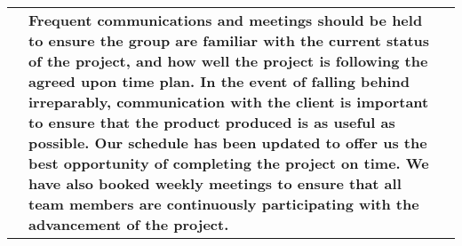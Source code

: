 \begin{xltabular}[H]{1.4\textwidth}{p{0.1\textwidth} | p{0.4\textwidth} | p{0.9\textwidth}}
    &

   \textbf{Frequent communications and meetings should be held to ensure the group are familiar with the current status of the project, and how well the project is following the agreed upon time plan. In the event of falling behind irreparably, communication with the client is important to ensure that the product produced is as useful as possible. Our schedule has been updated to offer us the best opportunity of completing the project on time. We have also booked weekly meetings to ensure that all team members are continuously participating with the advancement of the project.} \textbf{} \\

\end{xltabular}
\label{tbl:risk_table}
